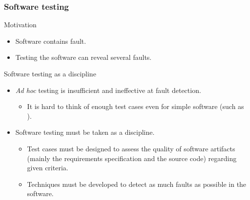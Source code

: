\begin{frame}[parent={cmap:software-testing-foundations}, hasprev=false, hasnext=true]
\frametitle{Software testing}

\begin{block:fact}{Motivation}
\begin{itemize}
	\item Software contains fault.

	\item Testing the software can reveal several faults.
\end{itemize}
\end{block:fact}

\begin{block:fact}{Software testing as a discipline}
\begin{itemize}
	\item \textit{Ad hoc} testing is insufficient and ineffective at fault
	detection.
	\begin{itemize}
		\item It is hard to think of enough test cases even for simple software
		(such as ).
	\end{itemize}

	\item Software testing must be taken as a discipline.
	\begin{itemize}
		\item Test cases must be designed to assess the quality of software
		artifacts (mainly the requirements specification and the source code)
		regarding given criteria.

		\item Techniques must be developed to detect as much faults as possible
		in the software.
	\end{itemize}
\end{itemize}
\end{block:fact}
\end{frame}



